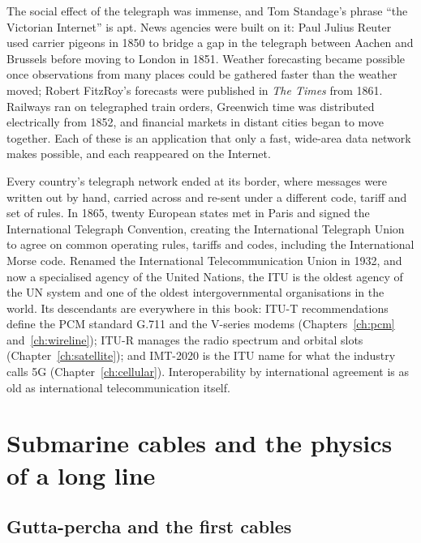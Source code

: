 The social effect of the telegraph was immense, and Tom Standage's phrase ``the Victorian Internet''
is apt. News agencies were built on it: Paul Julius Reuter used carrier pigeons in 1850 to bridge a
gap in the telegraph between Aachen and Brussels before moving to London in 1851. Weather forecasting
became possible once observations from many places could be gathered faster than the weather moved;
Robert FitzRoy's forecasts were published in \emph{The Times} from 1861. Railways ran on telegraphed
train orders, Greenwich time was distributed electrically from 1852, and financial markets in distant
cities began to move together. Each of these is an application that only a fast, wide-area data
network makes possible, and each reappeared on the Internet.

\begin{history}
Every country's telegraph network ended at its border, where messages were written out by hand,
carried across and re-sent under a different code, tariff and set of rules. In 1865, twenty
European states met in Paris and signed the International Telegraph Convention, creating the
International Telegraph Union to agree on common operating rules, tariffs and codes, including the
International Morse code. Renamed the International Telecommunication Union in 1932, and now a
specialised agency of the United Nations, the ITU is the oldest agency of the UN system and one of
the oldest intergovernmental organisations in the world. Its descendants are everywhere in this
book: ITU-T recommendations define the PCM standard G.711 and the V-series modems
(Chapters~\ref{ch:pcm} and~\ref{ch:wireline}); ITU-R manages the radio spectrum and orbital slots
(Chapter~\ref{ch:satellite}); and IMT-2020 is the ITU name for what the industry calls 5G
(Chapter~\ref{ch:cellular}). Interoperability by international agreement is as old as international
telecommunication itself.
\end{history}

\section{Submarine cables and the physics of a long line}
\label{sec:ch01:cables}

\subsection{Gutta-percha and the first cables}

